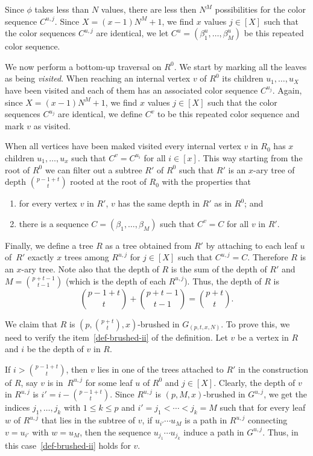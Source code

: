 \documentclass[11pt]{article}
\begin{document}
Since $\phi$ takes less than $N$ values, there are less then $N^{M}$ possibilities for
the color sequence $C^{u,j}$.
Since $X = (x-1)N^{M}+1$, we find $x$ values $j\in [X]$ such that the
color sequences $C^{u,j}$ are identical, we let
$C^{u}=\left(\beta^u_1,\ldots,\beta^u_{M}\right)$ be this repeated color sequence.

We now perform a bottom-up traversal on  $R^{0}$.
We start by marking all the leaves as being \emph{visited}.
When reaching an internal vertex $v$ of $R^{0}$ its children
$u_1,\ldots,u_X$ have been visited and each of them has an
associated color sequence $C^{u_j}$. Again, since $X = (x-1)N^{M}+1$,
we find $x$ values $j\in [X]$ such that the
color sequences $C^{u_j}$ are identical, we define
$C^{v}$ to be this repeated color sequence and mark
$v$ as visited.

When all vertices have been maked visited every internal vertex $v$ in $R_0$
has $x$ children $u_1,\ldots,u_x$ such that $C^v=C^{u_i}$ for all $i\in[x]$.
This way starting from the root of $R^0$ we can filter out a subtree $R'$
of $R^0$ such that $R'$ is an $x$-ary tree of depth $\binom{p-1+t}{t}$
rooted at the root of $R_0$ with the properties that
\begin{enumerate}[label=\textup{(\roman*)},nosep]
\item for every vertex $v$ in $R'$, $v$ has the same depth in $R'$ as in $R^0$; and
\item there is a sequence $C=(\beta_1,\ldots,\beta_M)$ such that $C^v=C$ for all $v$ in $R'$.
\end{enumerate}

Finally, we define a tree $R$ as a tree obtained from $R'$ by attaching to
each leaf $u$ of~$R'$ exactly $x$ trees among $R^{u,j}$ for $j\in[X]$ such
that $C^{u,j}=C$.  Therefore $R$ is an $x$-ary tree.  Note also that the
depth of $R$ is the sum of the depth of $R'$ and $M=\binom{p+t-1}{t-1}$
(which is the depth of each $R^{u,j}$).  Thus, the depth of $R$ is
\[
\binom{p-1+t}{t} + \binom{p+t-1}{t-1} = \binom{p+t}{t}.
\]

We claim that $R$ is $\left(p,\binom{p+t}{t},x\right)$-brushed in $G_{(p,t,x,N)}$. 
To prove this, we need to verify the item~\eqref{def-brushed-ii} of the definition.
Let $v$ be a vertex in $R$ and $i$ be the depth of $v$ in $R$.

If $i> \binom{p-1+t}{t}$, then $v$ lies in one of the trees attached to $R'$
in the construction of $R$, say $v$ is in~$R^{u,j}$ for some leaf $u$ of
$R^0$ and $j\in[X]$.  Clearly, the depth of $v$ in $R^{u,j}$ is
$i'=i-\binom{p-1+t}{t}$.  Since $R^{u,j}$ is $(p,M,x)$-brushed in $G^{u,j}$,
we get the indices $j_1,\ldots,j_k$ with $1\leq k\leq p$ and
$i'=j_1 < \cdots < j_k = M$ such that for every leaf $w$ of $R^{u,j}$ that
lies in the subtree of $v$, if $u_{i'}\cdots u_M$ is a path in $R^{u,j}$
connecting $v=u_{i'}$ with $w=u_M$, then the sequence $u_{j_1}\cdots u_{j_k}$
induce a path in $G^{u,j}$.  Thus, in this case~\eqref{def-brushed-ii} holds
for $v$.
\end{document}
